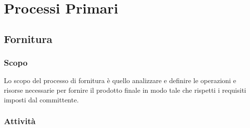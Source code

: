 \section{Processi Primari}
\subsection{Fornitura}
\subsubsection{Scopo}
Lo scopo del processo di fornitura è quello analizzare e definire le operazioni e risorse necessarie per fornire il prodotto finale in modo tale che rispetti i requisiti imposti dal committente.
\subsubsection{Attività}
